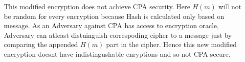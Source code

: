 This modified encryption does not achieve CPA security.
Here $H(m)$ will not be random for every encryption because Hash is 
calculated only based on message. As an Adversary against CPA
has access to encryption oracle, Adversary can atleast distuinguish correspoding 
cipher to a message just by comparing the appended $H(m)$ part in the cipher. Hence this 
new modified encryption doesnt have indistingushable enryptions and so not
CPA secure.